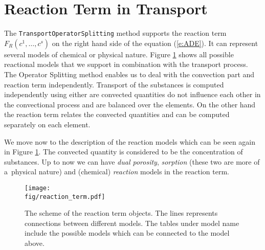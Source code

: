 \def\abs#1{\lvert#1\rvert}
\def\argdot{{\hspace{0.18em}\cdot\hspace{0.18em}}}
\def\avg#1{\left\{#1\right\}_\omega}
\def\D{{\tn D}}
\def\div{\operatorname{div}}
\def\Eh{\mathcal E_h}       %
\def\Ehcom{\mathcal E_{h,C}}         %
\def\Ehdir{\mathcal E_{h,D}}         %
\def\Ehint{\mathcal E_{h,I}}       %
\def\grad{\nabla}
\def\jmp#1{[#1]}
\def\n{\vc n}
\def\vc#1{\mathbf{\boldsymbol{#1}}}     %
\def\R{\mathbb R}
\def\sc#1#2{\left(#1,#2\right)}
\def\Th{\mathcal T_h}       %
\def\th{\vartheta}
\def\tn#1{{\mathbb{#1}}}    %
\def\Tr{\operatorname{Tr}}
\def\where{\,|\,}

\section{Reaction Term in Transport}
\label{sec:reaction_term}

The {\tt TransportOperatorSplitting} method supports the reaction term $F_R(c^1,\ldots,c^s)$ on the right hand side of the equation (\ref{e:ADE}).
It can represent several models of chemical or physical nature. 
Figure \ref{fig:reaction_term} shows all possible reactional models that we support in combination with the transport process. The Operator Splitting method enables 
us to deal with the convection part and reaction term independently.
Transport of the substances is computed independently using either are convected quantities do not influence each other in the convectional
process and are balanced over the elements. On the other hand the reaction term relates the convected quantities and can be computed 
separately on each element.


We move now to the description of the reaction models which can be seen again in Figure \ref{fig:reaction_term}. 
The convected quantity is considered to be the concentration of substances. 
Up to now we can have \emph{dual porosity}, \emph{sorption} (these two are more of a~physical nature) and (chemical) \emph{reaction} models in the reaction term. 

\begin{figure}
  \centering
  \texttt{[image: \\fig/reaction\_term.pdf]}
  \caption{The scheme of the reaction term objects. The lines represents connections between different models. 
  The tables under model name include the possible models which can be connected to the model above.}
  \label{fig:reaction_term}
\end{figure}


